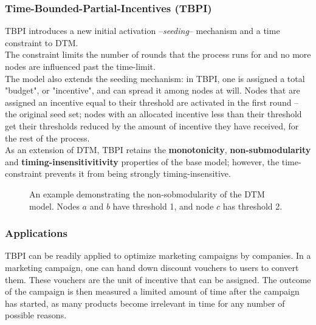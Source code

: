 \documentclass[twocolumn, 10pt]{article}
\begin{document}
\subsubsection{Time-Bounded-Partial-Incentives (TBPI)}
TBPI introduces a new initial activation --\textit{seeding}-- mechanism and a time constraint to DTM. \\
The constraint limits the number of rounds that the process runs for and no more nodes are influenced past the time-limit. \\
The model also extends the seeding mechanism: in TBPI, one is assigned a total "budget", or "incentive", and can spread it among nodes at will. Nodes that are assigned an incentive equal to their threshold are activated in the first round -- the original seed set; nodes with an allocated incentive less than their threshold get their thresholds reduced by the amount of incentive they have received, for the rest of the process. \\
As an extension of DTM, TBPI retains the \textbf{monotonicity}, \textbf{non-submodularity} and \textbf{timing-insensitivitivity} properties of the base model; however, the time-constraint prevents it from being strongly timing-insensitive.\\
\begin{figure}
\caption{An example demonstrating the non-sobmodularity of the DTM model. Nodes $a$ and $b$ have threshold 1, and node $c$ has threshold 2.}
\label{fig:DTM1}
\end{figure}
\subsubsection{Applications}
TBPI can be readily applied to optimize marketing campaigns by companies. In a marketing campaign, one can hand down discount vouchers to users to convert them. These vouchers are the unit of incentive that can be assigned. The outcome of the campaign is then measured a limited amount of time after the campaign has started, as many products become irrelevant in time for any number of possible reasons.
\end{document}
